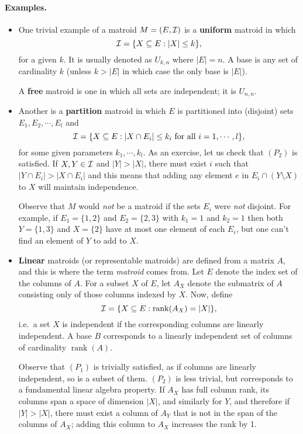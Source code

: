 \documentclass[12pt]{article}
\newcommand{\rank}{\operatorname{rank}}
\begin{document}
\paragraph{Examples.} 
\begin{itemize}
\item One trivial example of a matroid $M=(E,{\cal I})$ is a {\bf
    uniform} matroid in which
$${\cal I}=\{X\subseteq E: |X|\leq k\},$$ for a given $k$. It is
usually denoted as $U_{k,n}$ where $|E|=n$. A base is any set of
cardinality $k$ (unless $k>|E|$ in which case the only base is $|E|$).

A {\bf free} matroid is
one in which all sets are independent; it is $U_{n,n}$. 
\item
Another is a {\bf partition} matroid in which $E$ is partitioned into
(disjoint) sets $E_1, E_2, \cdots, E_l$ and $${\cal I}=\{X\subseteq E:
|X\cap E_i| \leq k_i \mbox{ for all } i=1,\cdots,l\},$$ for some given
parameters $k_1, \cdots, k_l$. As an exercise, let us check that
$(P_2)$ is satisfied. If $X, Y\in {\cal I}$ and $|Y|>|X|$, there must
exist $i$ such that $|Y\cap E_i|>|X\cap E_i|$ and this means that
adding any element $e$ in $E_i\cap (Y\setminus X)$ to $X$ will
maintain independence.

Observe that $M$ would {\it not} be a matroid if the sets $E_i$ were {\it
  not} disjoint. For example, if $E_1=\{1,2\}$ and $E_2=\{2,3\}$ with
  $k_1=1$ and $k_2=1$ then both $Y=\{1,3\}$ and $X=\{2\}$ have at most
  one element of each $E_i$, but one can't find an element of $Y$ to
  add to $X$. 

\item
{\bf Linear} matroids (or representable matroids) are defined from a matrix $A$, and this is
where the term {\it matroid} comes from. Let $E$ denote the index set
of the columns of $A$. For a subset $X$ of $E$, let $A_X$ denote the
submatrix of $A$ consisting only of those columns indexed by $X$. Now,
define $${\cal I}=\{X\subseteq E: \rank(A_X)=|X|\},$$
i.e.\ a set $X$ is independent if the corresponding columns are
linearly independent. A base $B$ corresponds to a linearly independent
set of columns of cardinality $\rank(A)$.  

Observe that $(P_1)$ is trivially satisfied, as
if columns are linearly independent, so is a subset of them. $(P_2)$
is less trivial, but corresponds to a fundamental linear
algebra property. If $A_X$ has full column rank, its columns span a
space of dimension $|X|$, and similarly for $Y$, and therefore if
$|Y|>|X|$, there must exist a column of $A_Y$ that is not in the span
of the columns of $A_X$; adding this column to $A_X$ increases the rank by 1. 


\end{itemize}
\end{document}
